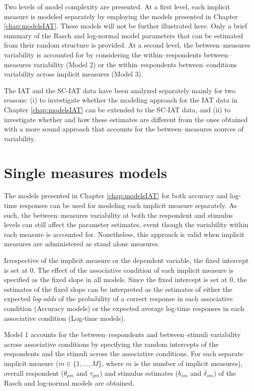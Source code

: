 \documentclass[12pt]{book}
\begin{document}
Two levels of model complexity are presented. 
At a first level, each implicit measure is modeled separately by employing the models presented in Chapter \ref{chap:modelsIAT}. 
These models will not be further illustrated here. Only a brief summary of the Rasch and log-normal model parameters that can be estimated from  their random structure is provided.
At a second level, the between--measures variability is accounted for by considering the within--respondents between--measures variability (Model 2) or the within--respondents between--conditions variability across implicit measures (Model 3). 

The IAT and the SC-IAT data have been analyzed separately mainly for two reasons: (i) to investigate whether the modeling approach for the IAT data in Chapter \ref{chap:modelsIAT} can be extended to the SC-IAT data, and (ii) to investigate whether and how these estimates are different from the ones obtained with a more sound approach that accounts for the between--measures sources of variability.

\section{Single measures models} \label{sec:singleModels}

The models presented in Chapter \ref{chap:modelsIAT} for both accuracy and log-time responses can be used for modeling each implicit measure separately. 
As such, the between--measures variability at both the respondent and stimulus levels can still affect the parameter estimates, event though the variability within each measure is accounted for.
Nonetheless, this approach is valid when implicit measures are administered as stand alone measures. 

Irrespective of the implicit measure or the dependent variable, the fixed intercept is set at $0$. 
The effect of the associative condition of each implicit measure is specified as the fixed slope in all models. Since the fixed intercept is set at $0$, the estimates of the fixed slope can be interpreted as the estimates of either the expected \emph{log-odds} of the probability of a correct response in each associative condition (Accuracy models) or the expected average log-time responses in each associative condition (Log-time models).

Model 1  accounts for the between--respondents and between--stimuli variability across associative conditions by specifying the random intercepts of  the respondents and the stimuli across the  associative conditions.
For each separate implicit measure ($m \in \{1,\ldots, M$\}, where $m$ is the number of implicit measures), overall respondent ($\theta_{pm}$ and $\tau_{pm}$) and stimulus estimates ($b_{sm}$ and $\delta_{sm}$) of the Rasch and log-normal models are obtained.
\end{document}
